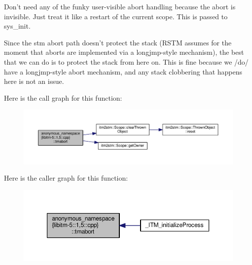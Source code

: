 Don't need any of the funky user-\/visible abort handling because the abort is invisible. Just treat it like a restart of the current scope. This is passed to sys\-\_\-init.

Since the stm abort path doesn't protect the stack (R\-S\-T\-M assumes for the moment that aborts are implemented via a longjmp-\/style mechanism), the best that we can do is to protect the stack from here on. This is fine because we /do/ have a longjmp-\/style abort mechanism, and any stack clobbering that happens here is not an issue. 

Here is the call graph for this function\-:
\nopagebreak
\begin{figure}[H]
\begin{center}
\leavevmode
\includegraphics[width=350pt]{namespaceanonymous__namespace_02libitm-5_81_005_8cpp_03_a4c66a5e4427961d821f3a610417cbf56_cgraph}
\end{center}
\end{figure}




Here is the caller graph for this function\-:
\nopagebreak
\begin{figure}[H]
\begin{center}
\leavevmode
\includegraphics[width=350pt]{namespaceanonymous__namespace_02libitm-5_81_005_8cpp_03_a4c66a5e4427961d821f3a610417cbf56_icgraph}
\end{center}
\end{figure}


